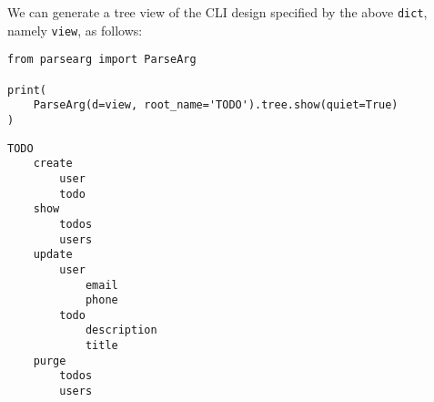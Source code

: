 \documentclass[10pt]{amsart}
\numberwithin{equation}{section}
\begin{document}
We can generate a tree view of the CLI design specified by the above \texttt{dict},
namely \texttt{view}, as follows:
\begin{verbatim}
from parsearg import ParseArg

print(
    ParseArg(d=view, root_name='TODO').tree.show(quiet=True)
)
\end{verbatim}

\begin{verbatim}
TODO
    create
        user
        todo
    show
        todos
        users
    update
        user
            email
            phone
        todo
            description
            title
    purge
        todos
        users


\end{verbatim}

\newpage
\end{document}
